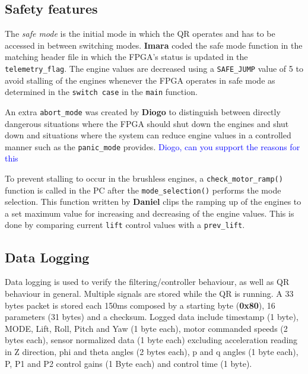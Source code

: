 \documentclass{article}
\newcommand\todo[1]{\textcolor{blue}{#1}} %
\begin{document}

\subsection{Safety features}
The \emph{safe mode} is the initial mode in which the QR operates and has to be accessed in between switching modes. \textbf{Imara} coded the safe mode function in the matching header file in which the FPGA's status is updated in the \texttt{telemetry\_flag}. The engine values are decreased using a \texttt{SAFE\_JUMP} value of 5 to avoid stalling of the engines whenever the FPGA operates in safe mode as determined in the \texttt{switch case} in the \texttt{main} function. 

An extra \texttt{abort\_mode} was created by \textbf{Diogo} to distinguish between directly dangerous situations where the FPGA should shut down the engines and shut down and situations where the system can reduce engine values in a controlled manner such as the \texttt{panic\_mode} provides. \todo{Diogo, can you support the reasons for this}

To prevent stalling to occur in the brushless engines, a \texttt{check\_motor\_ramp()} function is called in the PC after the \texttt{mode\_selection()} performs the mode selection. This function written by \textbf{Daniel} clips the ramping up of the engines to a set maximum value for increasing and decreasing of the engine values. This is done by comparing current \texttt{lift} control values with a \texttt{prev\_lift}. 

\subsection{Data Logging}

Data logging is used to verify the filtering/controller behaviour, as well as QR behaviour in general. Multiple signals are stored while the QR is running. A 33 bytes packet is stored each 150ms composed by a starting byte (\textbf{0x80}), 16 parameters (31 bytes) and a checksum. Logged data include timestamp (1 byte), MODE, Lift, Roll, Pitch and Yaw (1 byte each), motor commanded speeds (2 bytes each), sensor normalized data (1 byte each) excluding acceleration reading in Z direction, phi and theta angles (2 bytes each), p and q angles (1 byte each), P, P1 and P2 control gains (1 Byte each) and control time (1 byte).
\end{document}
